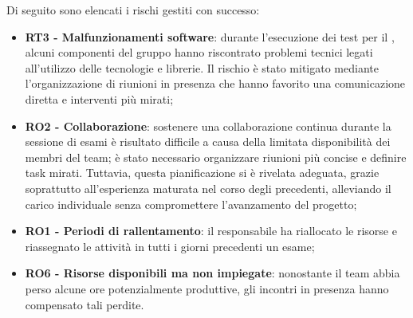 \vspace{0.5\baselineskip}
\par Di seguito sono elencati i rischi gestiti con successo:
\begin{itemize}
  \item \textbf{RT3 - Malfunzionamenti software}: durante l'esecuzione dei test per il , alcuni componenti del gruppo hanno riscontrato problemi tecnici legati all'utilizzo delle tecnologie e librerie. Il rischio è stato mitigato mediante l'organizzazione di riunioni in presenza che hanno favorito una comunicazione diretta e interventi più mirati;
  \item \textbf{RO2 - Collaborazione}: sostenere una collaborazione continua durante la sessione di esami è risultato difficile a causa della limitata disponibilità dei membri del team; è stato necessario organizzare riunioni più concise e definire task mirati. Tuttavia, questa pianificazione si è rivelata adeguata, grazie soprattutto all'esperienza maturata nel corso degli  precedenti, alleviando il carico individuale senza compromettere l'avanzamento del progetto;
  \item \textbf{RO1 - Periodi di rallentamento}: il responsabile ha riallocato le risorse e riassegnato le attività in tutti i giorni precedenti un esame;
  \item \textbf{RO6 - Risorse disponibili ma non impiegate}: nonostante il team abbia perso alcune ore potenzialmente produttive, gli incontri in presenza hanno compensato tali perdite.
\end{itemize}
